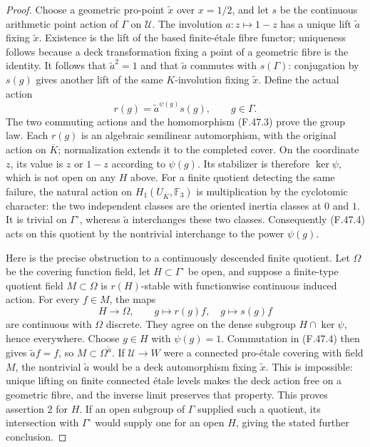 \begin{proof}
Choose a geometric pro-point $\widetilde x$ over
$x=1/2$, and let $s$ be the continuous arithmetic point
action of $\Gamma$ on $\mathcal U$. The involution
$a:z\mapsto1-z$ has a unique lift $\widetilde a$ fixing
$\widetilde x$. Existence is the lift of the based
finite-\'etale fibre functor; uniqueness follows because
a deck transformation fixing a point of a geometric
fibre is the identity. It follows that
$\widetilde a^2=1$ and that $\widetilde a$ commutes with
$s(\Gamma)$: conjugation by $s(g)$ gives another lift
of the same $K$-involution fixing $\widetilde x$.
Define the actual action
\[
 r(g)=\widetilde a^{\psi(g)}s(g),\qquad g\in\Gamma.
 \tag{F.47.4}
\]
The two commuting actions and the homomorphism (F.47.3)
prove the group law. Each $r(g)$ is an algebraic
semilinear automorphism, with the original action on
$\overline K$; normalization extends it to the completed
cover. On the coordinate $z$, its value is $z$ or
$1-z$ according to $\psi(g)$. Its stabilizer is therefore
$\ker\psi$, which is not open on any $H$ above.
For a finite quotient detecting the same failure, the
natural action on
$H_1(U_{\overline K},\mathbb F_3)$ is multiplication by
the cyclotomic character: the two independent classes
are the oriented inertia classes at $0$ and $1$.
It is trivial on $\Gamma^\circ$, whereas
$\widetilde a$ interchanges these two classes.
Consequently (F.47.4) acts on this quotient by the
nontrivial interchange to the power $\psi(g)$.

Here is the precise obstruction to a continuously
descended finite quotient. Let $\Omega$ be the covering
function field, let $H\subset\Gamma^\circ$ be open,
and suppose a finite-type quotient field
$M\subset\Omega$ is $r(H)$-stable with functionwise
continuous induced action. For every $f\in M$, the maps
\[
 H\longrightarrow\Omega,\qquad
 g\longmapsto r(g)f,\quad g\longmapsto s(g)f
\]
are continuous with $\Omega$ discrete. They agree on
the dense subgroup $H\cap\ker\psi$, hence everywhere.
Choose $g\in H$ with $\psi(g)=1$. Commutation in
(F.47.4) then gives $\widetilde a f=f$, so
$M\subset\Omega^{\widetilde a}$. If
$\mathcal U\to W$ were a connected pro-\'etale covering
with field $M$, the nontrivial $\widetilde a$ would be
a deck automorphism fixing $\widetilde x$. This is
impossible: unique lifting on finite connected
\'etale levels makes the deck action free on a geometric
fibre, and the inverse limit preserves that property.
This proves assertion 2 for $H$. If an open subgroup
of $\Gamma$ supplied such a quotient, its intersection
with $\Gamma^\circ$ would supply one for an open $H$,
giving the stated further conclusion.


\end{proof}
